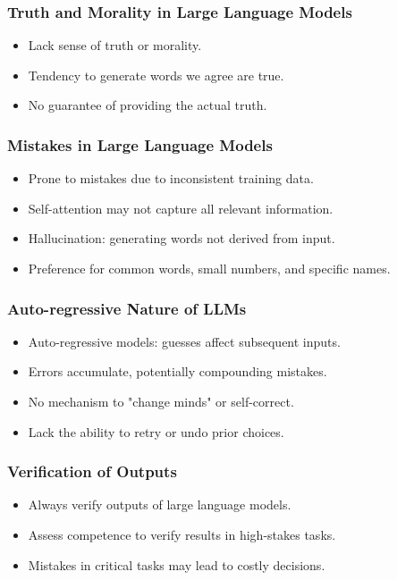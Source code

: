 \begin{frame}[fragile]\frametitle{Truth and Morality in Large Language Models}
  \begin{itemize}
    \item Lack sense of truth or morality.
    \item Tendency to generate words we agree are true.
    \item No guarantee of providing the actual truth.
  \end{itemize}
\end{frame}

\begin{frame}[fragile]\frametitle{Mistakes in Large Language Models}
  \begin{itemize}
    \item Prone to mistakes due to inconsistent training data.
    \item Self-attention may not capture all relevant information.
    \item Hallucination: generating words not derived from input.
    \item Preference for common words, small numbers, and specific names.
  \end{itemize}
\end{frame}

\begin{frame}[fragile]\frametitle{Auto-regressive Nature of LLMs}
  \begin{itemize}
    \item Auto-regressive models: guesses affect subsequent inputs.
    \item Errors accumulate, potentially compounding mistakes.
    \item No mechanism to "change minds" or self-correct.
    \item Lack the ability to retry or undo prior choices.
  \end{itemize}
\end{frame}

\begin{frame}[fragile]\frametitle{Verification of Outputs}
\begin{itemize}
    \item Always verify outputs of large language models.
    \item Assess competence to verify results in high-stakes tasks.
    \item Mistakes in critical tasks may lead to costly decisions.
\end{itemize}
\end{frame}

